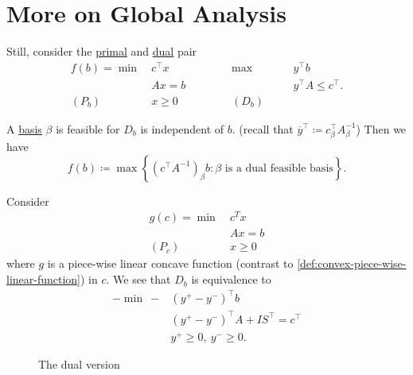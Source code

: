\section{More on Global Analysis}
Still, consider the \hyperref[def:primal]{primal} and \hyperref[def:dual]{dual} pair
\[
	\begin{alignedat}{5}
		f(b) = \min~&c^{\top}x\qquad\qquad&&\max ~&&y^{\top}b\\
		&Ax = b 				&&		&&y^{\top}A\leq c^{\top}.\\
		(P_b)\quad	&x\geq  0 	&&(D_b)\quad&&
	\end{alignedat}
\]

A \hyperref[def:basic]{basis} \(\beta\) is feasible for \(D_b\) is independent of \(b\). (recall that \(\overline{y}^{\top}\coloneqq c_{\beta}^{\top}A^{-1}_{\beta}\)) Then we have
\[
	f(b)\coloneqq \max\left\{ (c^{\top}A^{-1})_{\beta}b \colon \beta \text{ is a dual feasible basis} \right\} .
\]

Consider
\begin{align*}
	g(c)=\min~ & c^Tx    \\
	           & Ax = b  \\
	(P_c)\quad & x\geq 0
\end{align*}
where \(g\) is a piece-wise linear concave function (contrast to \autoref{def:convex-piece-wise-linear-function}) in \(c\). We see that \(D_b\) is equivalence to
\begin{align*}
	-\min~  - & (y^+ - y^-)^{\top}b                         \\
	          & (y^+ - y^-)^{\top}A + I S^{\top} = c^{\top} \\
	          & y^+\geq 0,\ y^- \geq 0.
\end{align*}

\begin{figure}[H]
	\centering
	\caption{The dual version}
	\label{fig:local-analysis-dual}
\end{figure}